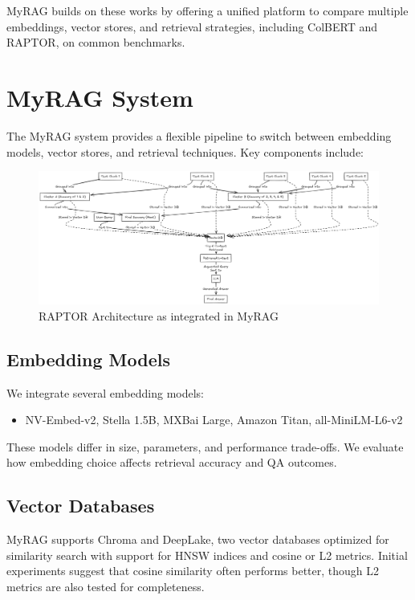 \documentclass{scrartcl}
\begin{document}
MyRAG builds on these works by offering a unified platform to compare multiple embeddings, vector stores, and retrieval strategies, including ColBERT and RAPTOR, on common benchmarks.

\section{MyRAG System}

The MyRAG system provides a flexible pipeline to switch between embedding models, vector stores, and retrieval techniques. Key components include:

\begin{figure}[h]
	\centering
	\includegraphics[scale=0.1]{raptor_final.png}
	\caption{RAPTOR Architecture as integrated in MyRAG}
	\label{fig:raptor}
\end{figure}

\subsection{Embedding Models}

We integrate several embedding models:
\begin{itemize}
    \item NV-Embed-v2, Stella 1.5B, MXBai Large, Amazon Titan, all-MiniLM-L6-v2
\end{itemize}
These models differ in size, parameters, and performance trade-offs. We evaluate how embedding choice affects retrieval accuracy and QA outcomes.

\subsection{Vector Databases}

MyRAG supports Chroma and DeepLake, two vector databases optimized for similarity search with support for HNSW indices and cosine or L2 metrics. Initial experiments suggest that cosine similarity often performs better, though L2 metrics are also tested for completeness.
\end{document}
